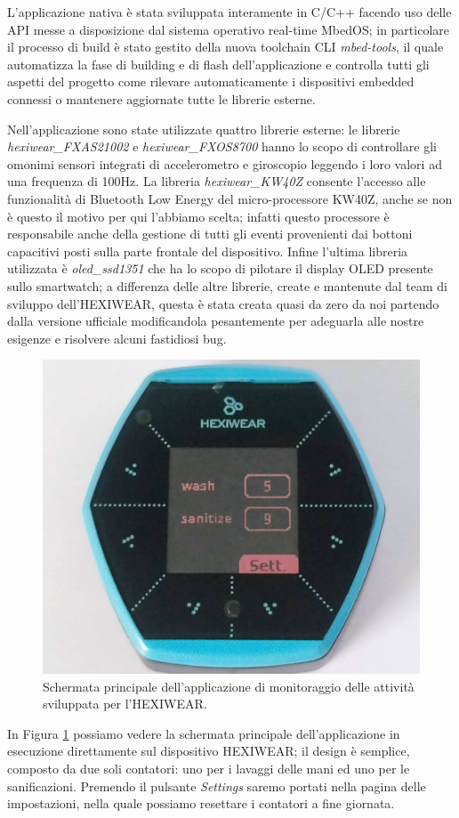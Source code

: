 L'applicazione nativa è stata sviluppata interamente in C/C++ facendo uso delle API messe a disposizione dal sistema operativo real-time MbedOS; in particolare il processo di build è stato gestito della nuova toolchain CLI \textit{mbed-tools}\cite{mbedtools}, il quale automatizza la fase di building e di flash dell'applicazione e controlla tutti gli aspetti del progetto come rilevare automaticamente i dispositivi embedded connessi o mantenere aggiornate tutte le librerie esterne.

Nell'applicazione sono state utilizzate quattro librerie esterne: le librerie \textit{hexiwear\_FXAS21002}\cite{fxas21002} e \textit{hexiwear\_FXOS8700}\cite{fxos87700} hanno lo scopo di controllare gli omonimi sensori integrati di accelerometro e giroscopio leggendo i loro valori ad una frequenza di 100Hz. La libreria \textit{hexiwear\_KW40Z}\cite{kw40z} consente l'accesso alle funzionalità di Bluetooth Low Energy del micro-processore KW40Z, anche se non è questo il motivo per qui l'abbiamo scelta; infatti questo processore è responsabile anche della gestione di tutti gli eventi provenienti dai bottoni capacitivi posti sulla parte frontale del dispositivo. Infine l'ultima libreria utilizzata è \textit{oled\_ssd1351}\cite{ssd1351} che ha lo scopo di pilotare il display OLED presente sullo smartwatch; a differenza delle altre librerie, create e mantenute dal team di sviluppo dell'HEXIWEAR, questa è stata creata quasi da zero da noi partendo dalla versione ufficiale modificandola pesantemente per adeguarla alle nostre esigenze e risolvere alcuni fastidiosi bug.

\begin{figure}[!htb]
    \centering
    \includegraphics[width=.4\textwidth]{figure/hexiwear-app.jpg}
    \caption{Schermata principale dell'applicazione di monitoraggio delle attività sviluppata per l'HEXIWEAR.}
    \label{fig:hexiwear-app}
\end{figure}

In Figura \ref{fig:hexiwear-app} possiamo vedere la schermata principale dell'applicazione in esecuzione direttamente sul dispositivo HEXIWEAR; il design è semplice, composto da due soli contatori: uno per i lavaggi delle mani ed uno per le sanificazioni. Premendo il pulsante \textit{Settings} saremo portati nella pagina delle impostazioni, nella quale possiamo resettare i contatori a fine giornata.

